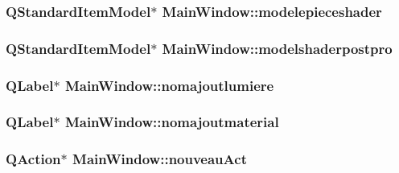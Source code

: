 \hypertarget{class_main_window_a6be7cafd28d97201c3df69a7b144f456}{
\subsubsection[{modelepieceshader}]{\setlength{\rightskip}{0pt plus 5cm}Q\+Standard\+Item\+Model$\ast$ Main\+Window\+::modelepieceshader\hspace{0.3cm}{\ttfamily [private]}}}\label{class_main_window_a6be7cafd28d97201c3df69a7b144f456}
\hypertarget{class_main_window_abe8e6602c96035cc908b094c3afd70b8}{
\subsubsection[{modelshaderpostpro}]{\setlength{\rightskip}{0pt plus 5cm}Q\+Standard\+Item\+Model$\ast$ Main\+Window\+::modelshaderpostpro\hspace{0.3cm}{\ttfamily [private]}}}\label{class_main_window_abe8e6602c96035cc908b094c3afd70b8}
\hypertarget{class_main_window_ad38c142eee23820d2d4c87217ea3558a}{
\subsubsection[{nomajoutlumiere}]{\setlength{\rightskip}{0pt plus 5cm}Q\+Label$\ast$ Main\+Window\+::nomajoutlumiere\hspace{0.3cm}{\ttfamily [private]}}}\label{class_main_window_ad38c142eee23820d2d4c87217ea3558a}
\hypertarget{class_main_window_ae0e05e579231d8e870d07ba9e4ae7223}{
\subsubsection[{nomajoutmaterial}]{\setlength{\rightskip}{0pt plus 5cm}Q\+Label$\ast$ Main\+Window\+::nomajoutmaterial\hspace{0.3cm}{\ttfamily [private]}}}\label{class_main_window_ae0e05e579231d8e870d07ba9e4ae7223}
\hypertarget{class_main_window_a193a37a0da1d22c48c64af3f6c5a6c51}{
\subsubsection[{nouveau\+Act}]{\setlength{\rightskip}{0pt plus 5cm}Q\+Action$\ast$ Main\+Window\+::nouveau\+Act\hspace{0.3cm}{\ttfamily [private]}}}\label{class_main_window_a193a37a0da1d22c48c64af3f6c5a6c51}
